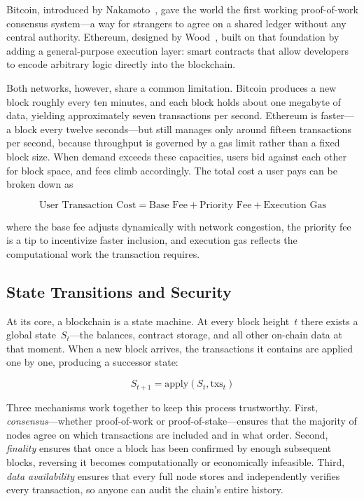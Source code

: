 \documentclass[
]{elteikthesis}[2024/04/26]
\begin{document}
Bitcoin, introduced by Nakamoto~\cite{nakamoto2008bitcoin}, gave the world the first working proof-of-work consensus system---a way for strangers to agree on a shared ledger without any central authority. Ethereum, designed by Wood~\cite{wood2014ethereum}, built on that foundation by adding a general-purpose execution layer: smart contracts that allow developers to encode arbitrary logic directly into the blockchain.

Both networks, however, share a common limitation. Bitcoin produces a new block roughly every ten minutes, and each block holds about one megabyte of data, yielding approximately seven transactions per second. Ethereum is faster---a block every twelve seconds---but still manages only around fifteen transactions per second, because throughput is governed by a gas limit rather than a fixed block size. When demand exceeds these capacities, users bid against each other for block space, and fees climb accordingly. The total cost a user pays can be broken down as

\begin{equation}
\text{User Transaction Cost} = \text{Base Fee} + \text{Priority Fee} + \text{Execution Gas}
\end{equation}

\noindent where the base fee adjusts dynamically with network congestion, the priority fee is a tip to incentivize faster inclusion, and execution gas reflects the computational work the transaction requires.

\subsection{State Transitions and Security}

At its core, a blockchain is a state machine. At every block height~$t$ there exists a global state~$S_t$---the balances, contract storage, and all other on-chain data at that moment. When a new block arrives, the transactions it contains are applied one by one, producing a successor state:

\begin{equation}
S_{t+1} = \text{apply}(S_t, \text{txs}_t)
\end{equation}

Three mechanisms work together to keep this process trustworthy. First, \textit{consensus}---whether proof-of-work or proof-of-stake---ensures that the majority of nodes agree on which transactions are included and in what order. Second, \textit{finality} ensures that once a block has been confirmed by enough subsequent blocks, reversing it becomes computationally or economically infeasible. Third, \textit{data availability} ensures that every full node stores and independently verifies every transaction, so anyone can audit the chain's entire history.
\end{document}
